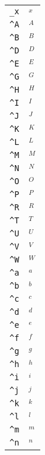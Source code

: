 \begin{longtable}{ll}
\texttt{\_x}&${}_x{}$\\
\texttt{\textasciicircum A}&${}^A{}$\\
\texttt{\textasciicircum B}&${}^B{}$\\
\texttt{\textasciicircum D}&${}^D{}$\\
\texttt{\textasciicircum E}&${}^E{}$\\
\texttt{\textasciicircum G}&${}^G{}$\\
\texttt{\textasciicircum H}&${}^H{}$\\
\texttt{\textasciicircum I}&${}^I{}$\\
\texttt{\textasciicircum J}&${}^J{}$\\
\texttt{\textasciicircum K}&${}^K{}$\\
\texttt{\textasciicircum L}&${}^L{}$\\
\texttt{\textasciicircum M}&${}^M{}$\\
\texttt{\textasciicircum N}&${}^N{}$\\
\texttt{\textasciicircum O}&${}^O{}$\\
\texttt{\textasciicircum P}&${}^P{}$\\
\texttt{\textasciicircum R}&${}^R{}$\\
\texttt{\textasciicircum T}&${}^T{}$\\
\texttt{\textasciicircum U}&${}^U{}$\\
\texttt{\textasciicircum V}&${}^V{}$\\
\texttt{\textasciicircum W}&${}^W{}$\\
\texttt{\textasciicircum a}&${}^a{}$\\
\texttt{\textasciicircum b}&${}^b{}$\\
\texttt{\textasciicircum c}&${}^c{}$\\
\texttt{\textasciicircum d}&${}^d{}$\\
\texttt{\textasciicircum e}&${}^e{}$\\
\texttt{\textasciicircum f}&${}^f{}$\\
\texttt{\textasciicircum g}&${}^g{}$\\
\texttt{\textasciicircum h}&${}^h{}$\\
\texttt{\textasciicircum i}&${}^i{}$\\
\texttt{\textasciicircum j}&${}^j{}$\\
\texttt{\textasciicircum k}&${}^k{}$\\
\texttt{\textasciicircum l}&${}^l{}$\\
\texttt{\textasciicircum m}&${}^m{}$\\
\texttt{\textasciicircum n}&${}^n{}$\\

\end{longtable}
